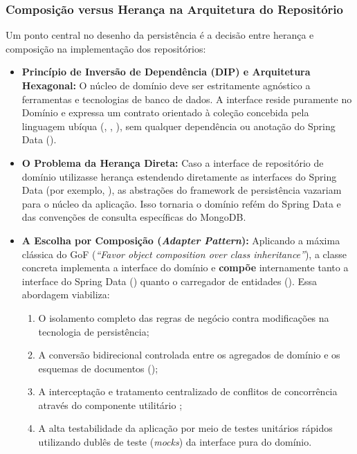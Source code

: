\subsubsection{Composição versus Herança na Arquitetura do Repositório}

Um ponto central no desenho da persistência é a decisão entre herança e composição na implementação dos repositórios:
\begin{itemize}
  \item \textbf{Princípio de Inversão de Dependência (DIP) e Arquitetura Hexagonal:} O núcleo de domínio deve ser estritamente agnóstico a ferramentas e tecnologias de banco de dados. A interface  reside puramente no Domínio e expressa um contrato orientado à coleção concebida pela linguagem ubíqua (, , ), sem qualquer dependência ou anotação do Spring Data ().
  \item \textbf{O Problema da Herança Direta:} Caso a interface de repositório de domínio utilizasse herança estendendo diretamente as interfaces do Spring Data (por exemplo, ), as abstrações do framework de persistência vazariam para o núcleo da aplicação. Isso tornaria o domínio refém do Spring Data e das convenções de consulta específicas do MongoDB.
  \item \textbf{A Escolha por Composição (\textit{Adapter Pattern}):} Aplicando a máxima clássica do GoF (\textit{``Favor object composition over class inheritance''}), a classe concreta  implementa a interface do domínio e \textbf{compõe} internamente tanto a interface do Spring Data () quanto o carregador de entidades (). Essa abordagem viabiliza:
    \begin{enumerate}
      \item O isolamento completo das regras de negócio contra modificações na tecnologia de persistência;
      \item A conversão bidirecional controlada entre os agregados de domínio e os esquemas de documentos ();
      \item A interceptação e tratamento centralizado de conflitos de concorrência através do componente utilitário ;
      \item A alta testabilidade da aplicação por meio de testes unitários rápidos utilizando dublês de teste (\textit{mocks}) da interface pura do domínio.
    \end{enumerate}
\end{itemize}

